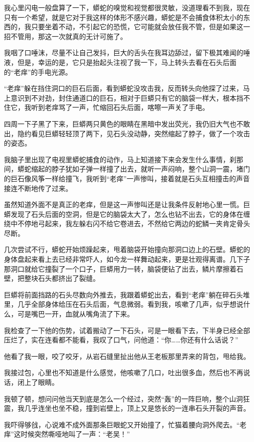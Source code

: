 我心里闪电一般盘算了一下，蟒蛇的嗅觉和视觉都很灵敏，没道理看不到我，现在只有一个希望，就是它对于我这样的体形不感兴趣，蟒蛇是不会捕食体积太小的东西的，我只要坐着不动，不引起它的恐慌，它可能就会放任我不管，但是如果这一招不管用，那这一次就真的无计可施了。

我咽了口唾沫，尽量不让自己发抖，巨大的舌头在我耳边舔过，留下极其难闻的唾液，但是，幸运的是，它只是抬起头注视了我一下，马上转头去看在石头后面的“老痒”的手电光源。

“老痒”躲在挡住洞口的巨石后面，看到蟒蛇没攻击我，反而转头向他探了过来，马上意识到不对劲，封住通道口的巨石，相对于巨蟒只有它的脑袋一样大，根本挡不住它，我听到老痒骂了一声，忙缩回石头后面，喀嚓一声关了手电。

四周一下子黑了下来，巨蟒两只黄色的眼睛在黑暗中发出荧光，我仍旧大气也不敢出，隐约看见巨蟒轻轻顶了两下，见石头没动静，突然缩起了脖子，做了一个攻击的姿态。

我脑子里出现了电视里蟒蛇捕食的动作，马上知道接下来会发生什么事情，刹那间，蟒蛇缩起的脖子犹如子弹一样撞了出去，就听一声闷响，整个山洞一震，堵门的巨石像风筝一样给撞飞，我听到“老痒”一声惨叫，接着就是石头互相撞击的声音接连不断地传了过来。

虽然知道外面不是真正的老痒，但是这一声惨叫还是让我条件反射地心里一慌。巨蟒发现了石头后面的空洞，但是它的脑袋太大了，怎么也钻不出去，它的身体在缠绕中不停地弓起来，我左躲右闪不给它卷进去，不然给它两边的蛇鳞一夹肯定骨头尽断。

几次尝试不行，蟒蛇开始烦躁起来，甩着脑袋开始撞向那洞口边上的石壁。蟒蛇的身体盘起来看上去已经非常吓人，如今龙一样舞动起来，更是壮观得离谱。几下子那洞口就给它撞裂了一个口子，巨蟒用力一转，脑袋便钻了出去，鳞片摩擦着石壁，把整块石头都挤出了裂缝。

巨蟒将前面挡路的石头尽数向外推去，我跟着蟒蛇出去，看到“老痒”躺在碎石头堆里，几乎全部身体给压在石头后面，气息微弱。看到我，咳嗽了几声，似乎想说什么，可是嘴巴一开，血就从嘴角流了下来。

我检查了一下他的伤势，试着搬动了一下石头，可是一眼看下去，下半身已经全部压烂了，实在连看都不能看，我叹了口气，问他道：“你……你还有什么话说？”

他看了我一眼，咬了咬牙，从岩石缝里扯出他从王老板那里弄来的背包，甩给我。

我接过包，心里也不知道是什么感觉，他咳嗽了几口，吐出很多血，然后也不再说话，闭上了眼睛。

我顿了顿，想问问他当天到底是怎么一个经过，突然“轰”的一阵巨响，整个山洞狂震，我几乎连坐也坐不稳，撞到岩壁上，顶上又是悠长的一连串石头开裂的声音。

我吓得够戗，心说难不成外面那条巨眼蛇又开始撞了，忙猫着腰向洞外爬去。“老痒”这时候突然嘶哑地叫了一声：“老吴！”


